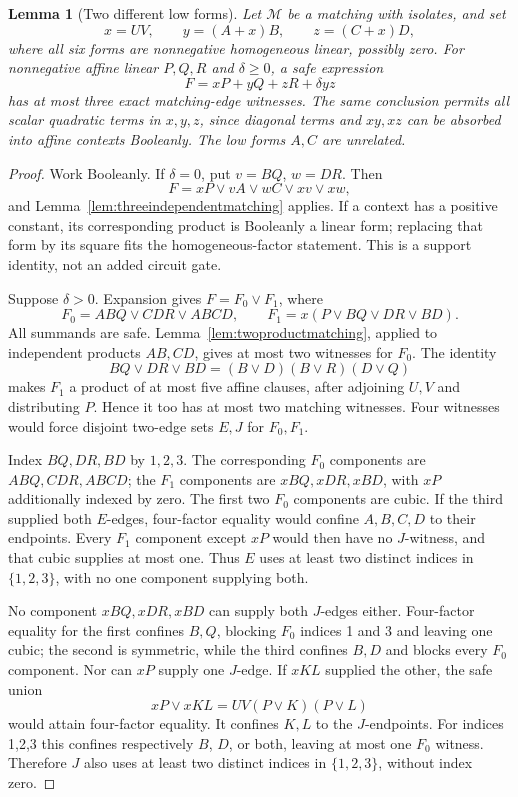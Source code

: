 \documentclass[11pt]{article}
\newtheorem{lemma}[theorem]{Lemma}
\theoremstyle{definition}
\theoremstyle{remark}
\begin{document}
\begin{lemma}[Two different low forms]\label{lem:differentlowfork}
Let $\mathcal M$ be a matching with isolates, and set
\[
 x=UV,\qquad y=(A+x)B,\qquad z=(C+x)D,
\]
where all six forms are nonnegative homogeneous linear, possibly zero. For nonnegative affine linear $P,Q,R$ and $\delta\ge0$, a safe expression
\[
 F=xP+yQ+zR+\delta yz
\]
has at most three exact matching-edge witnesses. The same conclusion permits all scalar quadratic terms in $x,y,z$, since diagonal terms and $xy,xz$ can be absorbed into affine contexts Booleanly. The low forms $A,C$ are unrelated.
\end{lemma}
\begin{proof}
Work Booleanly. If $\delta=0$, put $v=BQ$, $w=DR$. Then
\[
 F=xP\vee vA\vee wC\vee xv\vee xw,
\]
and Lemma~\ref{lem:threeindependentmatching} applies. If a context has a positive constant, its corresponding product is Booleanly a linear form; replacing that form by its square fits the homogeneous-factor statement. This is a support identity, not an added circuit gate.

Suppose $\delta>0$. Expansion gives $F=F_0\vee F_1$, where
\[
 F_0=ABQ\vee CDR\vee ABCD,\qquad
 F_1=x(P\vee BQ\vee DR\vee BD).
\]
All summands are safe. Lemma~\ref{lem:twoproductmatching}, applied to independent products $AB,CD$, gives at most two witnesses for $F_0$. The identity
\[
 BQ\vee DR\vee BD=(B\vee D)(B\vee R)(D\vee Q)
\]
makes $F_1$ a product of at most five affine clauses, after adjoining $U,V$ and distributing $P$. Hence it too has at most two matching witnesses. Four witnesses would force disjoint two-edge sets $E,J$ for $F_0,F_1$.

Index $BQ,DR,BD$ by $1,2,3$. The corresponding $F_0$ components are $ABQ,CDR,ABCD$; the $F_1$ components are $xBQ,xDR,xBD$, with $xP$ additionally indexed by zero. The first two $F_0$ components are cubic. If the third supplied both $E$-edges, four-factor equality would confine $A,B,C,D$ to their endpoints. Every $F_1$ component except $xP$ would then have no $J$-witness, and that cubic supplies at most one. Thus $E$ uses at least two distinct indices in $\{1,2,3\}$, with no one component supplying both.

No component $xBQ,xDR,xBD$ can supply both $J$-edges either. Four-factor equality for the first confines $B,Q$, blocking $F_0$ indices 1 and 3 and leaving one cubic; the second is symmetric, while the third confines $B,D$ and blocks every $F_0$ component. Nor can $xP$ supply one $J$-edge. If $xKL$ supplied the other, the safe union
\[
 xP\vee xKL=UV(P\vee K)(P\vee L)
\]
would attain four-factor equality. It confines $K,L$ to the $J$-endpoints. For indices 1,2,3 this confines respectively $B$, $D$, or both, leaving at most one $F_0$ witness. Therefore $J$ also uses at least two distinct indices in $\{1,2,3\}$, without index zero.


\end{proof}
\end{document}
